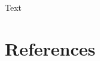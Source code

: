 \documentclass{scrbook}
\begin{document}
	
	Text \cite{sagas_publ}
	
	\section*{References}
	\printbibliography
	
\end{document}
